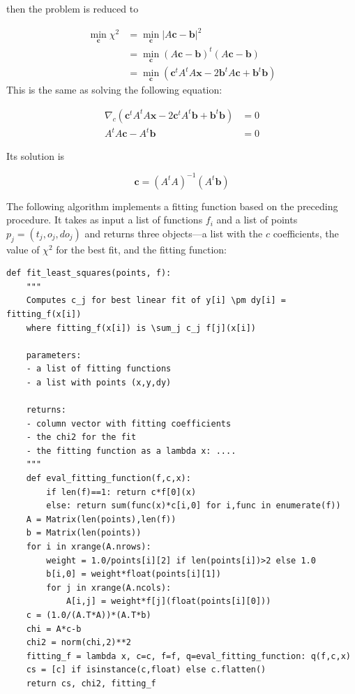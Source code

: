 \documentclass[justified,sixbynine]{tufte-book}
\def\ft{\small\tt}
\theoremstyle{plain}%
\theoremstyle{definition}
\theoremstyle{remark}
\begin{document}
\begin{fullwidth}
then the problem is reduced to

\begin{align}
\min_{\mathbf{c}}\chi^2 &= \min_{\mathbf{c}} |A\mathbf{c}-\mathbf{b}|^2 \\
  &= \min_{\mathbf{c}} (A\mathbf{c}-\mathbf{b})^t (A\mathbf{c}-\mathbf{b}) \\
  &= \min_{\mathbf{c}} (\mathbf{c}^t A^t A \mathbf x - 2\mathbf{b}^t A \mathbf{c} + \mathbf{b}^t \mathbf{b})
\end{align}
This is the same as solving the following equation:

\begin{align}
\nabla_{c} (\mathbf{c}^t A^t A \mathbf x - 2\mathbf{c}^t A^t \mathbf{b} + \mathbf{b}^t\mathbf{b}) &= 0 \\
A^t A \mathbf{c} - A^t \mathbf{b} &= 0
\end{align}

Its solution is

\begin{equation}
\mathbf{c} = (A^t A)^{-1} (A^t \mathbf{b})
\end{equation}

The following algorithm implements a fitting function based on the preceding procedure. It takes as input a list of functions $f_i$ and a list of points $p_j=(t_j,o_j,do_j)$ and returns three objects---a list with the $c$ coefficients, the value of $\chi^2$ for the best fit, and the fitting function:

\begin{lstlisting}[caption={in file: {\ft nlib.py}}]
def fit_least_squares(points, f):
    """
    Computes c_j for best linear fit of y[i] \pm dy[i] = fitting_f(x[i])
    where fitting_f(x[i]) is \sum_j c_j f[j](x[i])

    parameters:
    - a list of fitting functions
    - a list with points (x,y,dy)

    returns:
    - column vector with fitting coefficients
    - the chi2 for the fit
    - the fitting function as a lambda x: ....
    """
    def eval_fitting_function(f,c,x):
        if len(f)==1: return c*f[0](x)
        else: return sum(func(x)*c[i,0] for i,func in enumerate(f))
    A = Matrix(len(points),len(f))
    b = Matrix(len(points))
    for i in xrange(A.nrows):
        weight = 1.0/points[i][2] if len(points[i])>2 else 1.0
        b[i,0] = weight*float(points[i][1])
        for j in xrange(A.ncols):
            A[i,j] = weight*f[j](float(points[i][0]))
    c = (1.0/(A.T*A))*(A.T*b)
    chi = A*c-b
    chi2 = norm(chi,2)**2
    fitting_f = lambda x, c=c, f=f, q=eval_fitting_function: q(f,c,x)
    cs = [c] if isinstance(c,float) else c.flatten()
    return cs, chi2, fitting_f


\end{lstlisting}
\end{fullwidth}
\end{document}

